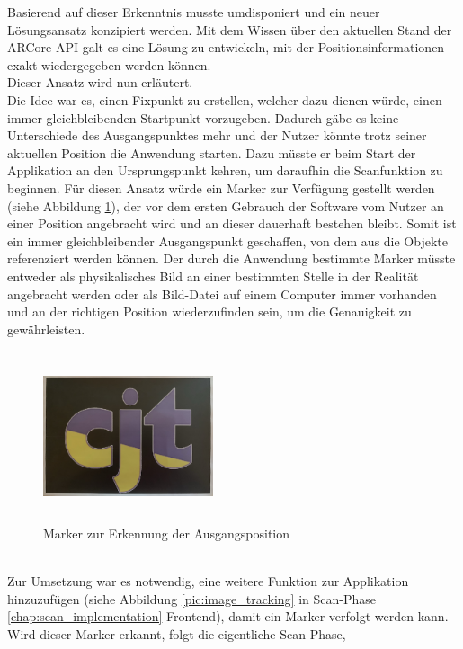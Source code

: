 Basierend auf dieser Erkenntnis musste umdisponiert und ein neuer Lösungsansatz konzipiert werden. Mit dem Wissen über den aktuellen Stand der ARCore \acs{API} 
galt es eine Lösung zu entwickeln, mit der Positionsinformationen exakt wiedergegeben werden können. 
\\ 
Dieser Ansatz wird nun erläutert.
\\ 
\linebreak
Die Idee war es, einen Fixpunkt zu erstellen, welcher dazu dienen würde, einen immer gleichbleibenden Startpunkt vorzugeben. Dadurch gäbe es keine Unterschiede des 
Ausgangspunktes mehr und der Nutzer könnte trotz seiner aktuellen Position die Anwendung starten. Dazu müsste er beim Start der Applikation an den Ursprungspunkt kehren, 
um daraufhin die Scanfunktion zu beginnen. Für diesen Ansatz würde ein Marker zur Verfügung gestellt werden (siehe Abbildung \ref{pic:initialMarker}), der vor dem ersten 
Gebrauch der Software vom Nutzer an einer Position angebracht wird und an dieser dauerhaft bestehen bleibt. Somit ist ein immer gleichbleibender Ausgangspunkt geschaffen, 
von dem aus die Objekte referenziert werden können. Der durch die Anwendung bestimmte Marker müsste entweder als physikalisches Bild an einer bestimmten Stelle in der Realität 
angebracht werden oder als Bild-Datei auf einem Computer immer vorhanden und an der richtigen Position wiederzufinden sein, um die Genauigkeit zu gewährleisten. 
\begin{figure}[hbt!]
    \centering
    \includegraphics[width=5cm,height=5cm,keepaspectratio]{4Umsetzung/Bilder/cjt_logo_tracking.png}
    \caption{Marker zur Erkennung der Ausgangsposition}
    \label{pic:initialMarker}
\end{figure}
\\
Zur Umsetzung war es notwendig, eine weitere Funktion zur Applikation hinzuzufügen (siehe Abbildung \ref{pic:image_tracking} 
in Scan-Phase \ref{chap:scan_implementation} Frontend), damit ein Marker verfolgt werden kann. Wird dieser Marker erkannt, folgt die eigentliche Scan-Phase, 
